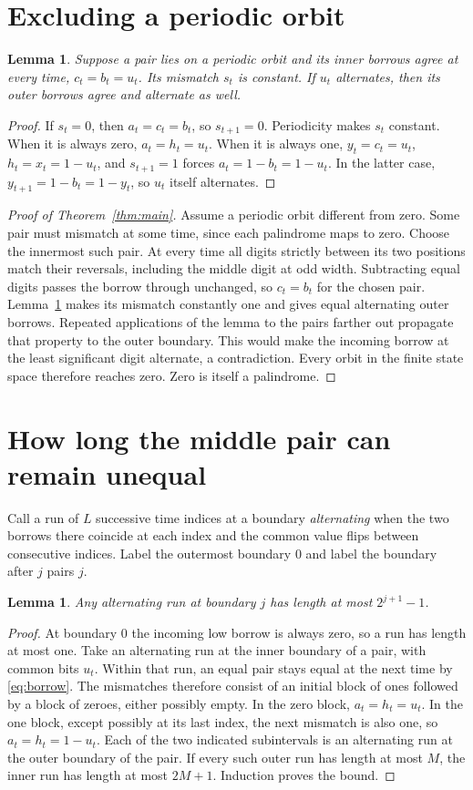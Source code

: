 \documentclass[11pt]{article}
\newtheorem{lemma}[theorem]{Lemma}
\begin{document}
\section{Excluding a periodic orbit}
\begin{lemma}\label{lem:period}
Suppose a pair lies on a periodic orbit and its inner borrows agree at every time, $c_t=b_t=u_t$. Its mismatch $s_t$ is constant. If $u_t$ alternates, then its outer borrows agree and alternate as well.
\end{lemma}
\begin{proof}
If $s_t=0$, then $a_t=c_t=b_t$, so $s_{t+1}=0$. Periodicity makes $s_t$ constant. When it is always zero, $a_t=h_t=u_t$. When it is always one, $y_t=c_t=u_t$, $h_t=x_t=1-u_t$, and $s_{t+1}=1$ forces $a_t=1-b_t=1-u_t$. In the latter case, $y_{t+1}=1-b_t=1-y_t$, so $u_t$ itself alternates.
\end{proof}
\begin{proof}[Proof of Theorem~\ref{thm:main}]
Assume a periodic orbit different from zero. Some pair must mismatch at some time, since each palindrome maps to zero. Choose the innermost such pair. At every time all digits strictly between its two positions match their reversals, including the middle digit at odd width. Subtracting equal digits passes the borrow through unchanged, so $c_t=b_t$ for the chosen pair. Lemma~\ref{lem:period} makes its mismatch constantly one and gives equal alternating outer borrows. Repeated applications of the lemma to the pairs farther out propagate that property to the outer boundary. This would make the incoming borrow at the least significant digit alternate, a contradiction. Every orbit in the finite state space therefore reaches zero. Zero is itself a palindrome.
\end{proof}

\section{How long the middle pair can remain unequal}
Call a run of $L$ successive time indices at a boundary \emph{alternating} when the two borrows there coincide at each index and the common value flips between consecutive indices. Label the outermost boundary $0$ and label the boundary after $j$ pairs $j$.
\begin{lemma}\label{lem:runs}
Any alternating run at boundary $j$ has length at most $2^{j+1}-1$.
\end{lemma}
\begin{proof}
At boundary $0$ the incoming low borrow is always zero, so a run has length at most one. Take an alternating run at the inner boundary of a pair, with common bits $u_t$. Within that run, an equal pair stays equal at the next time by \eqref{eq:borrow}. The mismatches therefore consist of an initial block of ones followed by a block of zeroes, either possibly empty. In the zero block, $a_t=h_t=u_t$. In the one block, except possibly at its last index, the next mismatch is also one, so $a_t=h_t=1-u_t$. Each of the two indicated subintervals is an alternating run at the outer boundary of the pair. If every such outer run has length at most $M$, the inner run has length at most $2M+1$. Induction proves the bound.
\end{proof}
\end{document}
